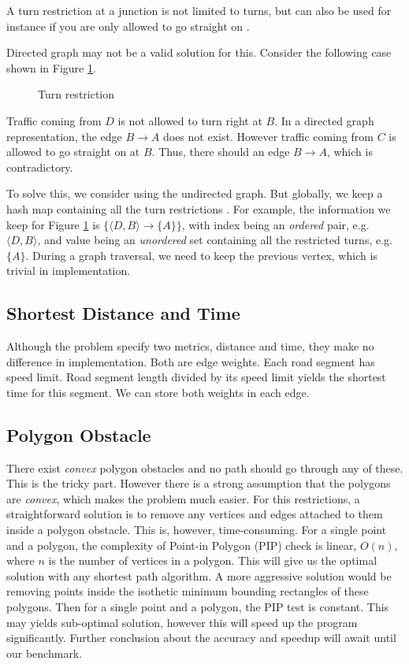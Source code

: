\documentclass[11pt]{article}
\begin{document}
A turn restriction at a junction is not limited to turns, but can
also be used for instance if you are only allowed to go straight
on \cite{osm:wiki:restriction}.

Directed graph may not be a valid solution for this.  Consider the
following case shown in Figure \ref{fig:turn}.

\begin{figure}[ht]
\label{fig:turn}
\centering

\caption{Turn restriction}\label{fig:turn}
\end{figure}

Traffic coming from \(D\) is not allowed to turn right at \(B\).
In a directed graph representation, the edge \(B\to A\) does not
exist.  However traffic coming from \(C\) is allowed to go straight
on at \(B\).  Thus, there should an edge \(B\to A\), which is
contradictory.

To solve this, we consider using the undirected graph.  But
globally, we keep a hash map containing all the turn restrictions
.
For example, the information we keep for Figure \ref{fig:turn} is
\(\{\langle D, B\rangle\to \{A\}\}\), with index being an \emph{ordered}
pair, e.g. \(\langle D, B\rangle\), and value being an \emph{unordered}
set containing all the restricted turns, e.g. \(\{A\}\).  During a
graph traversal, we need to keep the previous vertex, which is
trivial in implementation.

\subsection{Shortest Distance and Time}
\label{sec-2-2}

Although the problem specify two metrics, distance and time, they
make no difference in implementation.  Both are edge weights.  Each
road segment has speed limit.  Road segment length divided by its
speed limit yields the shortest time for this segment.  We can
store both weights in each edge.

\subsection{Polygon Obstacle}
\label{sec-2-3}

There exist \emph{convex} polygon obstacles and no path should go
through any of these.  This is the tricky part.  However there is a
strong assumption that the polygons are \emph{convex}, which makes the
problem much easier.  For this restrictions, a straightforward
solution is to remove any vertices and edges attached to them
inside a polygon obstacle.  This is, however, time-consuming.  For
a single point and a polygon, the complexity of Point-in Polygon
(PIP) check is linear, \(O(n)\), where \(n\) is the number of
vertices in a polygon.  This will give us the optimal solution with
any shortest path algorithm.  A more aggressive solution would be
removing points inside the isothetic minimum bounding rectangles of
these polygons.  Then for a single point and a polygon, the PIP
test is constant.  This may yields sub-optimal solution, however
this will speed up the program significantly.  Further conclusion
about the accuracy and speedup will await until our benchmark.
\end{document}
